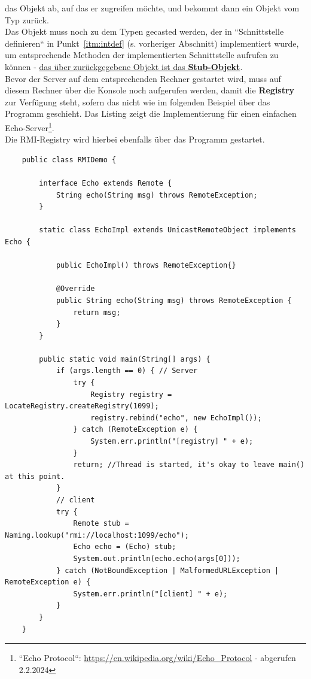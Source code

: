 \noindent
das Objekt ab, auf das er zugreifen möchte, und bekommt dann ein Objekt vom Typ  zurück.\\
Das Objekt muss noch zu dem Typen gecasted werden, der in ``Schnittstelle definieren`` in Punkt~\ref{itm:intdef} (s. vorheriger Abschnitt) implementiert wurde, um entsprechende Methoden der implementierten Schnittstelle aufrufen zu können - \ul{das über }\ul{ zurückgegebene Objekt ist das \textbf{Stub-Objekt}}.\\

\noindent
Bevor der Server auf dem entsprechenden Rechner gestartet wird, muss auf diesem Rechner über die Konsole noch  aufgerufen werden, damit die \textbf{Registry} zur Verfügung steht, sofern das nicht wie im folgenden Beispiel über das Programm geschieht.
Das Listing zeigt die Implementierung für einen einfachen Echo-Server\footnote{
``Echo Protocol``: \url{https://en.wikipedia.org/wiki/Echo_Protocol} - abgerufen 2.2.2024
}.\\
Die RMI-Registry wird hierbei ebenfalls über das Programm gestartet.
\begin{verbatim}
    public class RMIDemo {

        interface Echo extends Remote {
            String echo(String msg) throws RemoteException;
        }

        static class EchoImpl extends UnicastRemoteObject implements Echo {

            public EchoImpl() throws RemoteException{}

            @Override
            public String echo(String msg) throws RemoteException {
                return msg;
            }
        }

        public static void main(String[] args) {
            if (args.length == 0) { // Server
                try {
                    Registry registry = LocateRegistry.createRegistry(1099);
                    registry.rebind("echo", new EchoImpl());
                } catch (RemoteException e) {
                    System.err.println("[registry] " + e);
                }
                return; //Thread is started, it's okay to leave main() at this point.
            }
            // client
            try {
                Remote stub = Naming.lookup("rmi://localhost:1099/echo");
                Echo echo = (Echo) stub;
                System.out.println(echo.echo(args[0]));
            } catch (NotBoundException | MalformedURLException | RemoteException e) {
                System.err.println("[client] " + e);
            }
        }
    }
\end{verbatim}

